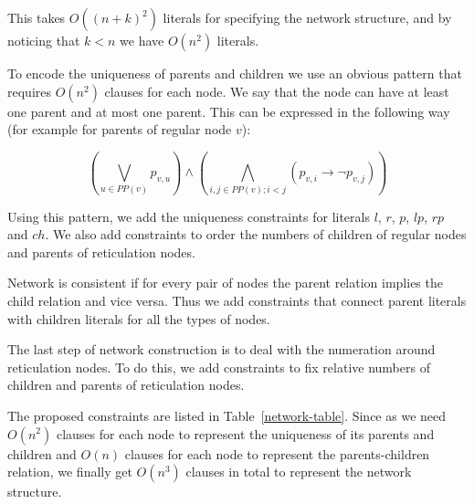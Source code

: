 \documentclass[runningheads, envcountsame, a4paper]{llncs}
\begin{document}
This takes $O((n + k)^2)$ literals for specifying the network structure, and by noticing that $k < n$ we have $O(n^2)$ literals.

To encode the uniqueness of parents and children we use an obvious pattern that requires $O(n^2)$ clauses for each node. We say 
that the node can have at least one parent and at most one parent. This can be expressed 
in the following way (for example for parents of regular node $v$): 

$$\left(\bigvee\limits_{u \in PP(v)} p_{v,u}\right) \wedge \left(\bigwedge\limits_{i, j \in PP(v);i < j} \left(p_{v,i} \rightarrow \neg p_{v,j}\right)\right)$$

Using this pattern, we add the uniqueness constraints for literals $l$, $r$, $p$, $lp$, $rp$ and $ch$. We also add constraints to order the numbers of children of regular nodes and parents of reticulation nodes.

Network is consistent if for every pair of nodes the parent relation implies the child relation and vice versa. Thus we add constraints that connect parent literals with children literals for all the types of nodes.

The last step of network construction is to deal with the numeration around reticulation nodes. To do this, we add constraints to fix 
relative numbers of children and parents of reticulation nodes. 

The proposed constraints are listed in Table~\ref{network-table}. Since as we need $O(n^2)$ clauses for each node to represent the uniqueness of 
its parents and children and $O(n)$ clauses for each node to represent the parents-children relation, we finally get $O(n^3)$ clauses in total 
to represent the network structure.
\end{document}
